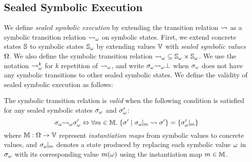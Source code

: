 \subsection{Sealed Symbolic Execution}

We define \textit{sealed symbolic execution} by extending the transition
relation $\leadsto$ as a symbolic transition relation ${\leadsto}_\omega$ on symbolic
states.  First, we extend concrete states $\mathbb{S}$ to symbolic states
${\mathbb{S}}_\omega$ by extending values $\mathbb{V}$ with \textit{sealed symbolic values}
$\Omega$.  We also define the symbolic transition relation ${\leadsto}_\omega
\subseteq {\mathbb{S}}_\omega \times {\mathbb{S}}_\omega$. We use the notation ${\leadsto}_\omega^k$
for $k$ repetition of ${\leadsto}_\omega$, and write ${\sigma}_\omega {\leadsto}_\omega \bot$ when
${\sigma}_\omega$ does not have any symbolic transitions to other sealed symbolic
states.  We define the validity of sealed symbolic execution as follows:
\begin{definition}[Validity]\label{def:valid-symbtrans}
  The symbolic transition relation is \textit{valid} when the following
  condition is satisfied for any sealed symbolic states ${\sigma}_\omega$ and
  ${\sigma}_\omega'$:
  \[
    \symbst \symbtrans \symbst' \Leftrightarrow
    \forall \imap \in \imapset. \;
    \{ \st' \mid \instant{\symbst}{\imap} \trans \st' \}
    = \{ \instant{\symbst'}{\imap} \}
  \]
  where $\mathbb{M}: \Omega \rightarrow \mathbb{V}$ represent \textit{instantiation
  maps} from symbolic values to concrete values, and ${\sigma}_\omega\!\!\mid\!\!_{m}$
  denotes a state produced by replacing each symbolic value $\omega$ in
  ${\sigma}_\omega$ with its
  corresponding value $m(\omega)$ using the instantiation map $m \in
  \mathbb{M}$.
\end{definition}

